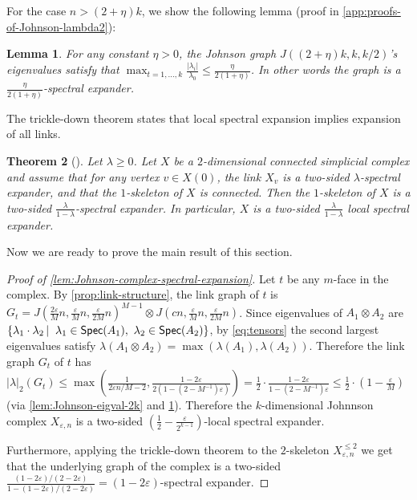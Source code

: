 \documentclass[10pt,a4paper]{article}
\newcommand{\prettyref}[1]{\cref{#1}}
\newtheorem{theorem}{Theorem}[section]
\newtheorem{lemma}[theorem]{Lemma}
\newtheorem{corollary}[theorem]{Corollary}
\theoremstyle{definition}
\theoremstyle{remark}
\newcommand{\abs}[1]{\lvert#1\rvert}
\newcommand\sett[2]{\left\{ #1 \left| \; \vphantom{#1 #2} \right. #2  \right\}}
\newcommand{\set}[1]{\{#1\}}
\renewcommand{\leq}{\leqslant}
\renewcommand{\le}{\leqslant}
\renewcommand{\geq}{\geqslant}
\numberwithin{equation}{section}
\let\pref=\prettyref
\begin{document}
For the case $n> (2+\eta)k$, we show the following lemma (proof in \pref{app:proofs-of-Johnson-lambda2}):
\begin{lemma}\label{lem:Johnson-eigval-g2k}
     For any constant $\eta > 0$, the Johnson graph $J((2+\eta)k,k,k/2)$'s eigenvalues satisfy that $\max_{t=1,\dots,k}\frac{\abs{\lambda_i}}{\lambda_0} \le  \frac{\eta}{2(1+\eta)}
$. In other words the graph is a $\frac{\eta}{2(1+\eta)}$-spectral expander. 
\end{lemma}

The trickle-down theorem states that local spectral expansion implies expansion of all links. 
\begin{theorem}[\cite{oppenheim2018local}] \label{thm:trickle-down}
    Let \(\lambda\geq 0\). Let \(X\) be a \(2\)-dimensional connected simplicial complex and assume that for any vertex \(v \in X(0)\), the link \(X_v\) is a two-sided \(\lambda\)-spectral expander, and that the $1$-skeleton of $X$ is connected. Then the $1$-skeleton of \(X\) is a two-sided \(\frac{\lambda}{1-\lambda}\)-spectral expander.
    In particular, \(X\) is a two-sided \(\frac{\lambda}{1-\lambda}\) local spectral expander.
\end{theorem}
Now we are ready to prove the main result of this section.
\begin{proof}[Proof of \pref{lem:Johnson-complex-spectral-expansion}]
    Let $t$ be any $m$-face in the complex. By \pref{prop:link-structure}, the link graph of $t$ is \(G_t = J(\frac{2\varepsilon}{M}n,\frac{\varepsilon}{M}n,\frac{\varepsilon}{2M}n)^{M-1} \otimes J(cn,\frac{\varepsilon}{M}n,\frac{\varepsilon}{2M}n)\).
    Since eigenvalues of $A_1\otimes A_2$ are $\sett{ \lambda_1\cdot\lambda_2 }{\lambda_1 \in  \mathsf{Spec}(A_1),~ \lambda_2 \in  \mathsf{Spec}(A_2)}$, 
    by \pref{eq:tensors} the second largest eigenvalues satisfy  $\lambda(A_1\otimes A_2) = \max (\lambda(A_1), \lambda(A_2))$. Therefore the link graph $G_t$ of $t$ has $\abs{\lambda}_2(G_t)  \le \max\left(\frac{1}{2\varepsilon n/M - 2}, \frac{1-2\varepsilon}{2(1-(2-M^{-1})\varepsilon)}\right) =\frac{1}{2}\cdot \frac{1-2\varepsilon}{1-(2-M^{-1})\varepsilon} \le \frac{1}{2}\cdot\left(1-\frac{\varepsilon}{M}\right)$ (via \pref{lem:Johnson-eigval-2k} and \pref{lem:Johnson-eigval-g2k}). Therefore the $k$-dimensional Johnnson complex $X_{\varepsilon,n}$ is a two-sided $\left(\frac{1}{2}-\frac{\varepsilon}{2^{k-1}}\right)$-local spectral expander.

 Furthermore, applying the trickle-down theorem to the $2$-skeleton $X^{\le 2}_{\varepsilon,n}$ we get that the underlying graph of the complex is a two-sided $\frac{(1-2\varepsilon)/(2-2\varepsilon)}{1 - (1-2\varepsilon)/(2-2\varepsilon)} = (1-2\varepsilon)$-spectral expander. 
\end{proof}
\end{document}
